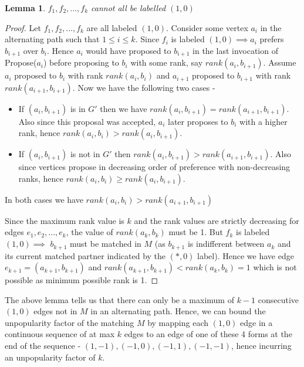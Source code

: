 \documentclass[a4paper,10pt]{article}
\theoremstyle{plain} %
\newtheorem{lemma}[theorem]{Lemma} %
\theoremstyle{plain} %
\begin{document}
\begin{lemma}
$f_1, f_2, ..., f_{k}$ cannot all be labelled $(1, 0)$    
\end{lemma}

\begin{proof}
    Let $f_1, f_2, ..., f_k$ are all labeled $(1, 0)$. Consider some vertex $a_i$ in the alternating path such that $1 \leq i \leq k$. Since $f_i$ is labeled $(1, 0) \implies a_i$ prefers $b_{i+1}$ over $b_i$. Hence $a_i$ would have proposed to $b_{i+1}$ in the last invocation of Propose($a_i$) before proposing to $b_i$ with some rank, say $rank(a_i, b_{i+1})$. Assume $a_i$ proposed to $b_i$ with rank $rank(a_i, b_i)$ and $a_{i+1}$ proposed to $b_{i+1}$ with rank $rank(a_{i+1}, b_{i+1})$. Now we have the following two cases - 
    \begin{itemize}
        \item If $(a_i, b_{i+1})$ is in $G'$ then we have $rank(a_i, b_{i+1}) = rank(a_{i+1}, b_{i+1})$. Also since this proposal was accepted, $a_i$ later proposes to $b_i$ with a higher rank, hence $rank(a_i, b_i) > rank(a_i, b_{i+1})$.
        \item If $(a_i, b_{i+1})$ is not in $G'$ then $rank(a_i, b_{i+1}) > rank(a_{i+1}, b_{i+1})$. Also since vertices propose in decreasing order of preference with non-decreasing ranks, hence $rank(a_i, b_i) \geq rank(a_i, b_{i+1})$.
    \end{itemize}
    In both cases we have $rank(a_i, b_i) > rank(a_{i+1}, b_{i+1})$

    Since the maximum rank value is $k$ and the rank values are strictly decreasing for edges $e_1, e_2, ..., e_k$, the value of $rank(a_k, b_k)$ must be 1. But $f_k$ is labeled $(1, 0) \implies$ $b_{k+1}$ must be matched in $M$ (as $b_{k+1}$ is indifferent between $a_k$ and its current matched partner indicated by the $(*, 0)$ label). Hence we have edge $e_{k+1} = (a_{k+1}, b_{k+1})$ and $rank(a_{k+1}, b_{k+1}) < rank(a_k, b_k) = 1$ which is not possible as minimum possible rank is 1.
\end{proof}

The above lemma tells us that there can only be a maximum of $k-1$ consecutive $(1, 0)$ edges not in $M$ in an alternating path. Hence, we can bound the unpopularity factor of the matching $M$ by mapping each $(1, 0)$ edge in a continuous sequence of at max $k$ edges to an edge of one of these 4 forms at the end of the sequence - $(1, -1), (-1, 0), (-1, 1), (-1, -1)$, hence incurring an unpopularity factor of $k$.
\end{document}
